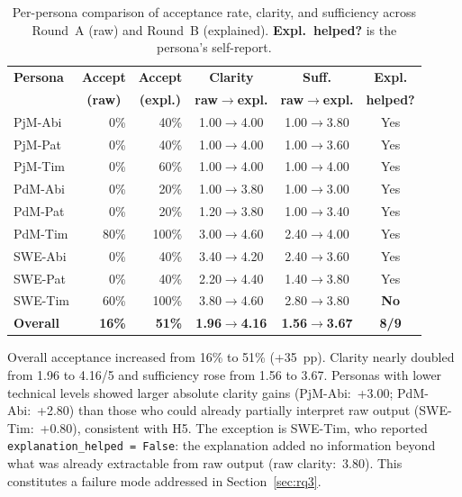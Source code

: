 \documentclass[sigconf,review]{acmart}
\begin{document}
\begin{table}[ht]
  \caption{Per-persona comparison of acceptance rate, clarity, and
           sufficiency across Round~A (raw) and Round~B (explained).
           \textbf{Expl.~helped?} is the persona's self-report.}
  \label{tab:rq1}
  \small
  \begin{tabular}{lrrccc}
    \toprule
    \textbf{Persona}
      & \multicolumn{1}{c}{\textbf{Accept}}
      & \multicolumn{1}{c}{\textbf{Accept}}
      & \textbf{Clarity}
      & \textbf{Suff.}
      & \textbf{Expl.} \\
      & \multicolumn{1}{c}{\textbf{(raw)}}
      & \multicolumn{1}{c}{\textbf{(expl.)}}
      & \textbf{raw$\to$expl.}
      & \textbf{raw$\to$expl.}
      & \textbf{helped?} \\
    \midrule
    PjM-Abi  & 0\%  & 40\%  & 1.00$\to$4.00 & 1.00$\to$3.80 & Yes \\
    PjM-Pat  & 0\%  & 40\%  & 1.00$\to$4.00 & 1.00$\to$3.60 & Yes \\
    PjM-Tim  & 0\%  & 60\%  & 1.00$\to$4.00 & 1.00$\to$4.00 & Yes \\
    PdM-Abi  & 0\%  & 20\%  & 1.00$\to$3.80 & 1.00$\to$3.00 & Yes \\
    PdM-Pat  & 0\%  & 20\%  & 1.20$\to$3.80 & 1.00$\to$3.40 & Yes \\
    PdM-Tim  & 80\% & 100\% & 3.00$\to$4.60 & 2.40$\to$4.00 & Yes \\
    SWE-Abi  & 0\%  & 40\%  & 3.40$\to$4.20 & 2.40$\to$3.60 & Yes \\
    SWE-Pat  & 0\%  & 40\%  & 2.20$\to$4.40 & 1.40$\to$3.80 & Yes \\
    SWE-Tim  & 60\% & 100\% & 3.80$\to$4.60 & 2.80$\to$3.80 & \textbf{No} \\
    \midrule
    \textbf{Overall}
      & \textbf{16\%} & \textbf{51\%}
      & \textbf{1.96$\to$4.16}
      & \textbf{1.56$\to$3.67}
      & \textbf{8/9} \\
    \bottomrule
  \end{tabular}
\end{table}

Overall acceptance increased from 16\% to 51\% (+35~pp). Clarity nearly
doubled from 1.96 to 4.16/5 and sufficiency rose from 1.56 to 3.67.
Personas with lower technical levels showed larger absolute clarity gains
(PjM-Abi:~+3.00; PdM-Abi:~+2.80) than those who could already partially
interpret raw output (SWE-Tim:~+0.80), consistent with H5. The exception
is SWE-Tim, who reported \texttt{explanation\_helped = False}: the
explanation added no information beyond what was already extractable from
raw output (raw clarity:~3.80). This constitutes a failure mode addressed
in Section~\ref{sec:rq3}.
\end{document}
